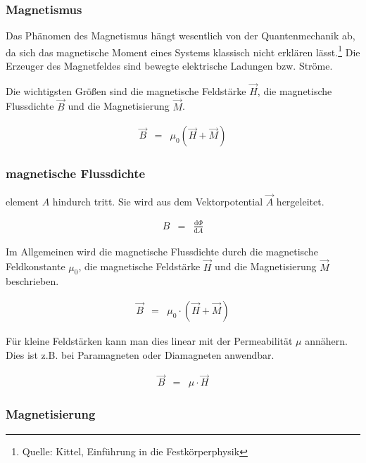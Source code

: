\documentclass[12pt,a4paper]{scrartcl}
\numberwithin{equation}{section} %
\renewcommand{\[}{} %
\renewcommand{\]}{\noindent} %
\begin{document}
\hypertarget{magnetismus}{%
\subsubsection{Magnetismus}\label{magnetismus}}

Das Phänomen des Magnetismus hängt wesentlich von der Quantenmechanik
ab, da sich das magnetische Moment eines Systems klassisch nicht
erklären lässt.\footnote{Quelle: Kittel, Einführung in die
  Festkörperphysik} Die Erzeuger des Magnetfeldes sind bewegte
elektrische Ladungen bzw. Ströme.

Die wichtigsten Größen sind die magnetische Feldstärke \(\vec H\), die
magnetische Flussdichte \(\vec B\) und die Magnetisierung \(\vec M\).

\[
\begin{eqnarray}
    \vec{B} &=& \mu_0
        \left(
            \vec H + \vec M
        \right)
\end{eqnarray}
\]

\hypertarget{magnetische-flussdichte}{%
\subsubsection{magnetische Flussdichte}\label{magnetische-flussdichte}}

element \(A\) hindurch tritt. Sie wird aus dem Vektorpotential
\(\vec A\) hergeleitet.

\[
\begin{eqnarray}
    B &=& \frac{\mathrm d\Phi}{\mathrm dA}
\end{eqnarray}
\]

Im Allgemeinen wird die magnetische Flussdichte durch die magnetische
Feldkonstante \(\mu_0\), die magnetische Feldstärke \(\vec H\) und die
Magnetisierung \(\vec M\) beschrieben.

\[
\begin{eqnarray}
    \vec B &=& \mu_0 \cdot \left(\vec H + \vec M\right)
\end{eqnarray}
\]

Für kleine Feldstärken kann man dies linear mit der Permeabilität
\(\mu\) annähern. Dies ist z.B. bei Paramagneten oder Diamagneten
anwendbar.

\[
\begin{eqnarray}
    \vec B &=& \mu \cdot \vec H
\end{eqnarray}
\]

\hypertarget{magnetisierung}{%
\subsubsection{Magnetisierung}\label{magnetisierung}}
\end{document}
